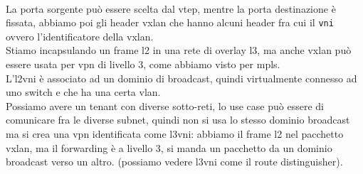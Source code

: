 \documentclass[12pt, oneside]{extbook} %
\begin{document}
\\La porta sorgente può essere scelta dal vtep, mentre la porta destinazione è fissata, abbiamo poi gli header vxlan che hanno alcuni header fra cui il \texttt{vni} ovvero l'identificatore della vxlan.
\\Stiamo incapsulando un frame l2 in una rete di overlay l3, ma anche vxlan può essere usata per vpn di livello 3, come abbiamo visto per mpls.
\\L'l2vni è associato ad un dominio di broadcast, quindi virtualmente connesso ad uno switch e che ha una certa vlan.
\\Possiamo avere un tenant con diverse sotto-reti, lo use case può essere di comunicare fra le diverse subnet, quindi non si usa lo stesso dominio broadcast ma si crea una vpn identificata come l3vni: abbiamo il frame l2 nel pacchetto vxlan, ma il forwarding è a livello 3, si manda un pacchetto da un dominio broadcast verso un altro. (possiamo vedere l3vni come il route distinguisher).
\end{document}
